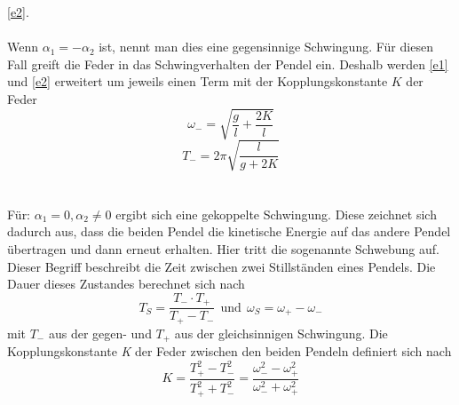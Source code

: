 \eqref{e2}.
\\
\\
Wenn $\alpha_{1} = -\alpha_{2}$ ist, nennt man dies eine gegensinnige Schwingung. Für diesen Fall greift die Feder in das Schwingverhalten
der Pendel ein. Deshalb werden \eqref{e1} und \eqref{e2} erweitert um jeweils einen Term mit der Kopplungskonstante $\textit{K}$
der Feder
\begin{equation}
  \omega_{-} = \sqrt{\frac{g}{l} + \frac{2 K}{l}}
  \label{e3}
\end{equation}
\begin{equation}
  \textit{T}_{-} = 2\pi  \sqrt{\frac{l}{g + 2 \textit{K}}}
  \label{e4}
\end{equation}
\\
\\
Für: $\alpha_{1} = 0, \alpha_{2} \neq 0$ ergibt sich eine gekoppelte Schwingung. Diese zeichnet sich dadurch aus, dass die beiden
Pendel die kinetische Energie auf das andere Pendel übertragen und dann erneut erhalten. Hier tritt die sogenannte Schwebung auf.
Dieser Begriff beschreibt die Zeit zwischen zwei Stillständen eines Pendels. Die Dauer dieses Zustandes berechnet sich nach
\begin{equation}
  \textit{T}_{S} = \frac{\textit{T}_{-} \cdot \textit{T}_{+}}{\textit{T}_{+} - \textit{T}_{-}}
  \ \ \text{und} \ \ \omega_{S} = \omega_{+} - \omega_{-}
  \label{e5}
\end{equation}
mit $\textit{T}_{-}$ aus der gegen- und $\textit{T}_{+}$ aus der gleichsinnigen Schwingung. Die Kopplungskonstante \textit{K}
der Feder zwischen den beiden Pendeln definiert sich nach
\begin{equation}
  \textit{K} = \frac{\textit{T}_{+}^{2} - \textit{T}_{-}^{2}}{\textit{T}_{+}^{2} + \textit{T}_{-}^{2}} =
  \frac{\omega_{-}^{2} - \omega_{+}^{2}}{\omega_{-}^{2} + \omega_{+}^{2}}
  \label{e6}
\end{equation}
